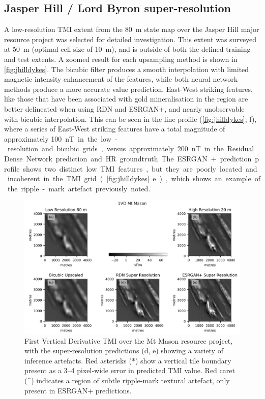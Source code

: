\documentclass[manuscript.tex]{subfiles}
\begin{document}
\subsection{Jasper Hill / Lord Byron super-resolution}
A low-resolution TMI extent from the \SI{80}{\metre} state map over the Jasper Hill major resource project was selected for detailed investigation.
This extent was surveyed at \SI{50}{\metre} (optimal cell size of \SI{10}{\metre}), and is outside of both the defined training and test extents.
A zoomed result for each upsampling method is shown in \cref{fig:jhilldykes}.
The bicubic filter produces a smooth interpolation with limited magnetic intensity enhancement of the features, while both neural network methods produce a more accurate value prediction.
East-West striking features, like those that have been associated with gold mineralisation in the region \parencite[p.~283]{salierTimingSourceGoldbearing2003} are better delineated when using RDN\textdaggerdbl{} and ESRGAN+, and nearly unobservable with bicubic interpolation.
This can be seen in the line profile (\cref{fig:jhilldykes}, f), where a series of East-West striking features have a total magnitude of approximately \SI{100}nT in the low-resolution and bicubic grids, versus approximately \SI{200}nT in the Residual Dense Network prediction and HR groundtruth.
The ESRGAN+ prediction profile shows two distinct low TMI features, but they are poorly located and incoherent in the TMI grid (\cref{fig:jhilldykes} e), which shows an example of the ripple-mark artefact previously noted.

\begin{figure}[hbt]
    \includegraphics[width=\linewidth]{fig/p1/image10.png}
    \caption[First Vertical Derivative SR TMI over the Mt Mason resource project]{First Vertical Derivative TMI over the Mt Mason resource project, with the super-resolution predictions (d, e) showing a variety of inference artefacts.
    Red asterisks (*) show a vertical tile boundary present as a 3--4 pixel-wide error in predicted TMI value.
    Red caret (\^{ }) indicates a region of subtle ripple-mark textural artefact, only present in ESRGAN+ predictions.
    }
    \label{fig:jhillvis}
\end{figure}
\end{document}
